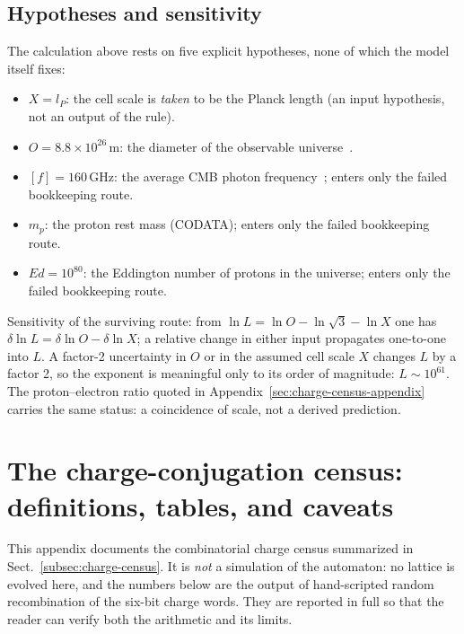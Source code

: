 \documentclass{ijuc}
\begin{document}
\subsection{Hypotheses and sensitivity}\label{subsec:appendixA-sensitivity}
The calculation above rests on five explicit hypotheses, none of which the model itself fixes:
\begin{itemize}
\item[H1] $X=l_{P}$: the cell scale is \emph{taken} to be the Planck length (an input hypothesis, not an output of the rule).
\item[H2] $O=8.8\times10^{26}$\,m: the diameter of the observable universe~\cite{halpbern}.
\item[H3] $[f]=160$\,GHz: the average CMB photon frequency~\cite{archeops}; enters only the failed bookkeeping route.
\item[H4] $m_{p}$: the proton rest mass (CODATA); enters only the failed bookkeeping route.
\item[H5] $Ed=10^{80}$: the Eddington number of protons in the universe; enters only the failed bookkeeping route.
\end{itemize}
Sensitivity of the surviving route: from $\ln L=\ln O-\ln\sqrt{3}-\ln X$ one has $\delta\ln L=\delta\ln O-\delta\ln X$; a relative change in either input propagates one-to-one into $L$.  A factor-2 uncertainty in $O$ or in the assumed cell scale $X$ changes $L$ by a factor 2, so the exponent is meaningful only to its order of magnitude: $L\sim10^{61}$.  The proton--electron ratio quoted in Appendix~\ref{sec:charge-census-appendix} carries the same status: a coincidence of scale, not a derived prediction.
\section{The charge-conjugation census: definitions, tables, and caveats\label{sec:charge-census-appendix}}
This appendix documents the combinatorial charge census summarized in Sect.~\ref{subsec:charge-census}.  It is \emph{not} a simulation of the automaton: no lattice is evolved here, and the numbers below are the output of hand-scripted random recombination of the six-bit charge words.  They are reported in full so that the reader can verify both the arithmetic and its limits.
\end{document}
